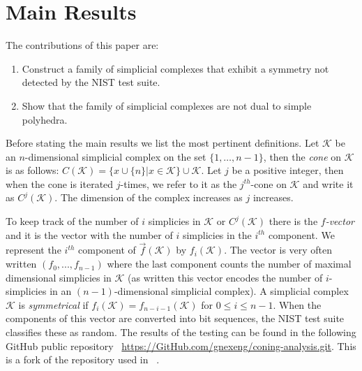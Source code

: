 \documentclass[oneside,12pt]{amsart}
\theoremstyle{definition}
\numberwithin{equation}{section}
\begin{document}
\section{Main Results}

The contributions of this paper are:\\[.2ex]
\begin{center}
\begin{enumerate}
  \item Construct a family of simplicial complexes that exhibit a symmetry not detected by the NIST test suite. \\[.8ex]
  \item Show that the family of simplicial complexes are not dual to simple polyhedra. \\
\end{enumerate}
\end{center}

Before stating the main results we list the most pertinent definitions.  Let $\mathcal{K}$ be an $n$-dimensional simplicial complex on the set $\{1,\ldots,n-1\}$, then the \textit{cone} on $\mathcal{K}$ is as follows: $C(\mathcal{K}) =   \{   x\cup \{n\}   |  x\in \mathcal{K}  \}  \cup \mathcal{K}$.  Let $j$ be a positive integer, then when the cone is iterated $j$-times, we refer to it as the $j^{th}$-cone on $\mathcal{K}$ and write it as $C^j(\mathcal{K})$.  The dimension of the complex increases as $j$ increases.

To keep track of the number of $i$ simplicies in $\mathcal{K}$ or $C^j(\mathcal{K})$ there is the \textit{$f$-vector} and it is the vector with the number of $i$ simplicies in the $i^{th}$ component.  We represent the $i^{th}$ component of $\overrightarrow{f}(\mathcal{K})$ by $f_{i}(\mathcal{K})$.  The vector is very often written $(f_0,...,f_{n-1})$ where the last component counts the number of maximal dimensional simplicies in $\mathcal{K}$ (as written this vector encodes the number of $i$-simplicies in an $(n-1)$-dimensional simplicial complex).  A simplicial complex $\mathcal{K}$ is \textit{symmetrical} if $f_i(\mathcal{K}) = f_{n-i-1}(\mathcal{K})$ for $0 \leq i \leq n-1$.  When the components of this vector are converted into bit sequences, the NIST test suite classifies these as random. The results of the testing can be found in the following GitHub public repository ~\url{https://GitHub.com/gnexeng/coning-analysis.git}. This is a fork of the repository used in ~\cite{ALDH}. %
\end{document}
